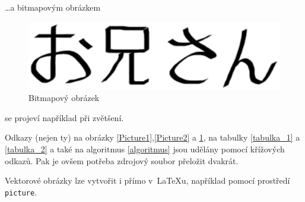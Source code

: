 \documentclass[11pt,a4paper]{article}
\begin{document}
\bigbreak

\dots a bitmapovým obrázkem



\begin{figure}[htb]
 	\centering
 		\includegraphics[scale=0.65]{oniisan2.eps}
 		\caption{Bitmapový obrázek}
 		\label{Picture3}
\end{figure}

\bigbreak

\noindent se projeví například při zvětšení.

Odkazy (nejen ty) na obrázky \ref{Picture1},\ref{Picture2} a \ref{Picture3}, na tabulky \ref{tabulka_1} a \ref{tabulka_2} a také na algoritmus \ref{algoritmus} jsou udělány pomocí křížových odkazů. Pak je ovšem potřeba zdrojový soubor přeložit dvakrát.

Vektorové obrázky lze vytvořit i přímo v~\LaTeX u, například pomocí prostředí \texttt{picture}.  

\newpage
\end{document}

